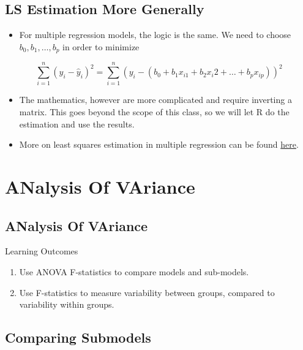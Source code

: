 \documentclass[]{book}
\providecommand{\tightlist}{%
  \setlength{\itemsep}{0pt}\setlength{\parskip}{0pt}}
\begin{document}
\subsection{LS Estimation More
Generally}\label{ls-estimation-more-generally}

\begin{itemize}
\tightlist
\item
  For multiple regression models, the logic is the same. We need to
  choose \(b_0, b_1, \ldots, b_p\) in order to minimize
\end{itemize}

\[ \displaystyle\sum_{i=1}^n (y_i -\hat{y}_i)^2  = \displaystyle\sum_{i=1}^n (y_i -(b_0 + b_1x_{i1} + b_2{x_i2} + \ldots + b_px_{ip}))^2 \]

\begin{itemize}
\item
  The mathematics, however are more complicated and require inverting a
  matrix. This goes beyond the scope of this class, so we will let R do
  the estimation and use the results.
\item
  More on least squares estimation in multiple regression can be found
  \href{http://www.math.chalmers.se/Stat/Grundutb/GU/MSG500/A10/lecture5.pdf}{here}.
\end{itemize}

\section{ANalysis Of VAriance}\label{analysis-of-variance}

\subsection{ANalysis Of VAriance}\label{analysis-of-variance-1}

Learning Outcomes

\begin{enumerate}
\def\labelenumi{\arabic{enumi}.}
\tightlist
\item
  Use ANOVA F-statistics to compare models and sub-models.\\
\item
  Use F-statistics to measure variability between groups, compared to
  variability within groups.
\end{enumerate}

\subsection{Comparing Submodels}\label{comparing-submodels}
\end{document}
